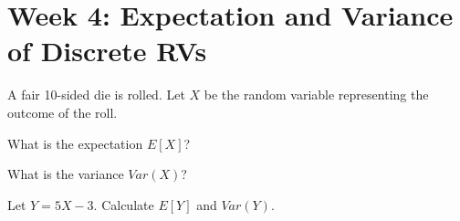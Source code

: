 \documentclass[a4paper, 10pt]{article}
\begin{document}
\subject[2110205 - Statistics for Computer Engineering]


\section{Week 4: Expectation and Variance of Discrete RVs}



\begin{problem}
A fair 10-sided die is rolled. Let \( X \) be the random variable representing the outcome of the roll.
\begin{subproblems}
    \item What is the expectation \( E[X] \)?
    \item What is the variance \( Var(X) \)?
    \item Let \( Y = 5X - 3 \). Calculate \( E[Y] \) and \( Var(Y) \).
\end{subproblems}
\end{problem}
\end{document}
